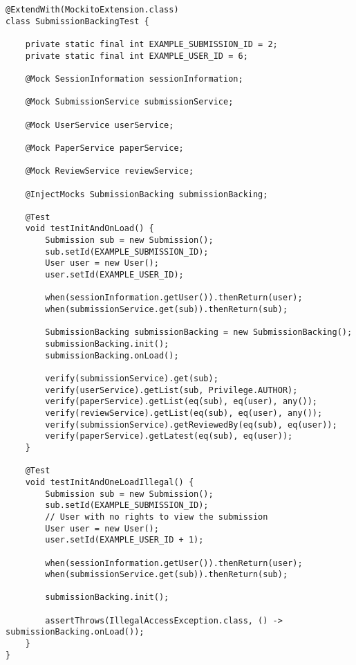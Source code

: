\begin{lstlisting}[label={lst:SubmissionBackingTest},caption={SubmissionBackingTest.java}]
@ExtendWith(MockitoExtension.class)
class SubmissionBackingTest {

    private static final int EXAMPLE_SUBMISSION_ID = 2;
    private static final int EXAMPLE_USER_ID = 6;

    @Mock SessionInformation sessionInformation;

    @Mock SubmissionService submissionService;

    @Mock UserService userService;

    @Mock PaperService paperService;

    @Mock ReviewService reviewService;

    @InjectMocks SubmissionBacking submissionBacking;

    @Test
    void testInitAndOnLoad() {
        Submission sub = new Submission();
        sub.setId(EXAMPLE_SUBMISSION_ID);
        User user = new User();
        user.setId(EXAMPLE_USER_ID);

        when(sessionInformation.getUser()).thenReturn(user);
        when(submissionService.get(sub)).thenReturn(sub);

        SubmissionBacking submissionBacking = new SubmissionBacking();
        submissionBacking.init();
        submissionBacking.onLoad();

        verify(submissionService).get(sub);
        verify(userService).getList(sub, Privilege.AUTHOR);
        verify(paperService).getList(eq(sub), eq(user), any());
        verify(reviewService).getList(eq(sub), eq(user), any());
        verify(submissionService).getReviewedBy(eq(sub), eq(user));
        verify(paperService).getLatest(eq(sub), eq(user));
    }

    @Test
    void testInitAndOneLoadIllegal() {
        Submission sub = new Submission();
        sub.setId(EXAMPLE_SUBMISSION_ID);
        // User with no rights to view the submission
        User user = new User();
        user.setId(EXAMPLE_USER_ID + 1);

        when(sessionInformation.getUser()).thenReturn(user);
        when(submissionService.get(sub)).thenReturn(sub);

        submissionBacking.init();

        assertThrows(IllegalAccessException.class, () -> submissionBacking.onLoad());
    }
}
\end{lstlisting}

